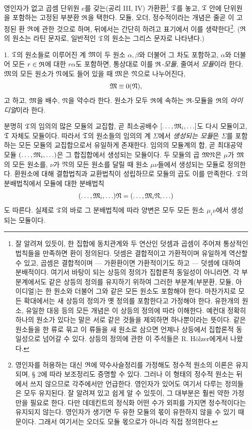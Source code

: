 영인자가 없고 곱셈 단위원 \(e\)를 갖는(공리 III, IV) 가환환\footnote{잘 알려져 있듯이, 한 집합에 동치관계와 두 연산인 덧셈과 곱셈이 주어져 통상적인 법칙들을 만족하면 환이 정의된다. 덧셈은 결합적이고 가환적이며 유일하게 역산할 수 있고, 곱셈은 결합적이며 --- 가환환이면 가환적이기도 하고 --- 덧셈에 대하여 분배적이다. 여기서 바탕이 되는 상등의 정의가 집합론적 동일성이 아니라면, 각 부분계에서도 같은 상등의 정의를 유지하기 위하여 그러한 부분계(부분환, 모듈, 아이디얼)는 한 원소와 더불어 그와 같은 모든 원소도 포함해야 한다. 마찬가지로 모든 확대에서는 새 상등의 정의가 옛 정의를 포함한다고 가정해야 한다. \glqq{}유한개의 원소\grqq{}, \glqq{}유일한 대응\grqq{} 등의 모든 개념은 이 상등의 정의에 따라 이해한다. 예컨대 \glqq{}정확히 하나의 원소\grqq{}가 있다는 말은 서로 같은 것들을 제외하면 하나뿐이라는 뜻이다. 같은 원소들을 한 류로 묶고 이 류들을 새 원소로 삼으면 언제나 상등에서 집합론적 동일성으로 넘어갈 수 있다. 상등의 정의에 관한 이 주석들은 R. Hölzer에게서 나왔다.} \(\mathfrak{T}\)를 놓고, \(\mathfrak{T}\) 안에 단위원을 포함하는 고정된 부분환 \(\mathfrak{R}\)을 택한다. 모듈, 오더, 정수적이라는 개념은 줄곧 이 고정된 환 \(\mathfrak{R}\)에 관한 것으로 하며, 뒤에서는 간단히 하려고 표기에서 이를 생략한다\footnote{영인자를 허용하는 대신 \(\mathfrak{R}\)에 약수사슬정리를 가정해도 정수적 원소의 이론은 유지되며, § 2에 따라 보조정리도 증명할 수 있다. 그러나 이 형태의 정수적 원소는 뒤에서 쓰지 않으므로 각주에서만 언급한다. 영인자가 있어도 여기서 다루는 정의들은 모두 유지된다. 잘 알려져 있고 쉽게 알 수 있듯이, 그 대부분은 훨씬 약한 가정만을 필요로 한다. 다만 데데킨트의 정식화 \glqq{}어떤 수가 외피를 가지면 정수적이다\grqq{}는 유지되지 않는다. 영인자가 생기면 두 유한 모듈의 몫이 유한하지 않을 수 있기 때문이다. 그래서 여기서는 오더도 모듈 몫으로가 아니라 직접 정의한다.}.
(\(\mathfrak{R}\)의 원소는 라틴 문자로, 일반적인 \(\mathfrak{T}\)의 원소는 그리스 문자로 나타낸다.)

1. \(\mathfrak{T}\)의 원소들로 이루어진 계 \(\mathfrak M\)이 두 원소 \(\alpha,\beta\)와 더불어 그 차도 포함하고, \(\alpha\)와 더불어 모든 \(r\in\mathfrak{R}\)에 대한 \(r\alpha\)도 포함하면, 통상대로 이를 \emph{\(\mathfrak{R}\)-모듈}, 줄여서 \emph{모듈}이라 한다. \(\mathfrak M\)의 모든 원소가 \(\mathfrak N\)에도 들어 있을 때 \(\mathfrak M\)은 \(\mathfrak N\)으로 나누어진다,
\[
        \mathfrak M\equiv 0(\mathfrak N),
\]
고 하고, \(\mathfrak M\)을 배수, \(\mathfrak N\)을 약수라 한다. 원소가 모두 \(\mathfrak{R}\)에 속하는 \(\mathfrak{R}\)-모듈을 \(\mathfrak{R}\)의 \emph{아이디얼}이라 한다.

분명히 \(\mathfrak{T}\)의 임의의 많은 모듈의 교집합, 곧 최소공배수 \([\ldots,\mathfrak M_i,\ldots]\)도 다시 모듈이고, \(\mathfrak{T}\) 자체도 모듈이다. 따라서 \(\mathfrak{T}\)의 원소들의 임의의 계 \(\Sigma\)에서 \emph{생성되는 모듈}은 \(\Sigma\)를 포함하는 모든 모듈의 교집합으로서 유일하게 존재한다. 임의의 모듈계의 합, 곧 최대공약모듈 \((\ldots,\mathfrak M_i,\ldots)\)은 그 합집합에서 생성되는 모듈이다. 두 모듈의 곱 \(\mathfrak M\mathfrak N\)은 \(\mu\)가 \(\mathfrak M\)의 모든 원소를, \(\nu\)가 \(\mathfrak N\)의 모든 원소를 달릴 때 원소 \(\mu\nu\)들에서 생성되는 모듈로 정의한다. 환원소에 대해 결합법칙과 교환법칙이 성립하므로 모듈의 곱도 이를 만족한다. \(\mathfrak{T}\)의 분배법칙에서 모듈에 대한 분배법칙
\[
        (\ldots,\mathfrak M_i,\ldots)\mathfrak N=(\ldots,\mathfrak M_i\mathfrak N,\ldots)
\]
도 따른다. 실제로 \(\mathfrak{T}\)의 바로 그 분배법칙에 따라 양변은 모두 모든 원소 \(\mu_i\nu\)에서 생성되는 모듈이다.

